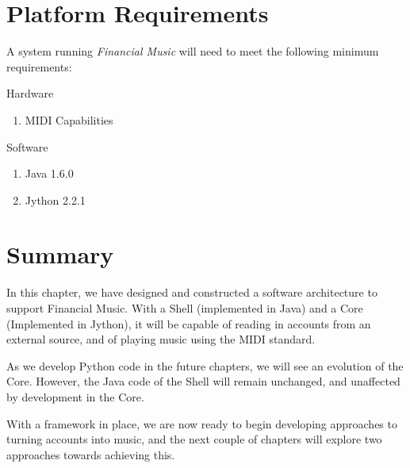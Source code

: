 \section{Platform Requirements}

A system running \textit{Financial Music} will need to meet the following minimum requirements:

\begin{enumerate}
\begin{singlespace}
\item Hardware
\begin{enumerate}
\item MIDI Capabilities
\end{enumerate}
\item Software
\begin{enumerate}
\item Java 1.6.0
\item Jython 2.2.1
\end{enumerate}
\end{singlespace}
\end{enumerate}

\section{Summary}

In this chapter, we have designed and constructed a software architecture to support Financial Music. With a Shell (implemented in Java) and a Core (Implemented in Jython), it will be capable of reading in accounts from an external source, and of playing music using the MIDI standard.

As we develop Python code in the future chapters, we will see an evolution of the Core. However, the Java code of the Shell will remain unchanged, and unaffected by development in the Core.

With a framework in place, we are now ready to begin developing approaches to turning accounts into music, and the next couple of chapters will explore two approaches towards achieving this.